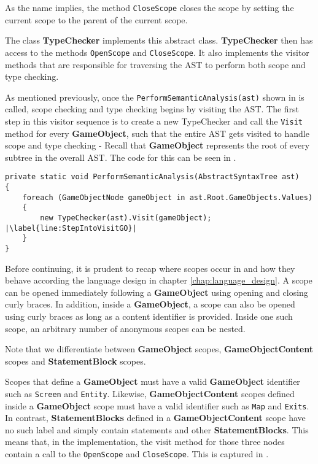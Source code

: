 As the name implies, the method \texttt{CloseScope} closes the scope by setting the current scope to the parent of the current scope. 


The class \textbf{TypeChecker} implements this abstract class. \textbf{TypeChecker} then has access to the methods \texttt{OpenScope} and \texttt{CloseScope}. It also implements the visitor methods that are responsible for traversing the AST to perform both scope and type checking.

As mentioned previously, once the \texttt{PerformSemanticAnalysis(ast)} shown in  is called, scope checking and type checking begins by visiting the AST. The first step in this visitor sequence is to create a new TypeChecker and call the \texttt{Visit} method for every \textbf{GameObject}, such that the entire AST gets visited to handle scope and type checking - Recall that \textbf{GameObject} represents the root of every subtree in the overall AST. The code for this can be seen in .

\begin{lstlisting}[language=CSharp, caption={Typechecker object for every GameObject}, label={lst:TypeCheckEachGO},escapechar=|]
private static void PerformSemanticAnalysis(AbstractSyntaxTree ast)
{
    foreach (GameObjectNode gameObject in ast.Root.GameObjects.Values)
    {
        new TypeChecker(ast).Visit(gameObject); |\label{line:StepIntoVisitGO}|
    }
}
\end{lstlisting}

Before continuing, it is prudent to recap where scopes occur in \dazel{} and how they behave according the language design in chapter \ref{chap:language_design}. A scope can be opened immediately following a \textbf{GameObject} using opening and closing curly braces. In addition, inside a \textbf{GameObject}, a scope can also be opened using curly braces as long as a content identifier is provided. Inside one such scope, an arbitrary number of anonymous scopes can be nested. 

Note that we differentiate between \textbf{GameObject} scopes, \textbf{GameObjectContent} scopes and \textbf{StatementBlock} scopes.

Scopes that define a \textbf{GameObject} must have a valid \textbf{GameObject} identifier such as \texttt{Screen} and \texttt{Entity}. 
Likewise, \textbf{GameObjectContent} scopes defined inside a \textbf{GameObject} scope must have a valid identifier such as \texttt{Map} and \texttt{Exits}. In contrast, \textbf{StatementBlocks} defined in a \textbf{GameObjectContent} scope have no such label and simply contain statements and other \textbf{StatementBlocks}. 
This means that, in the implementation, the visit method for those three nodes contain a call to the \texttt{OpenScope} and \texttt{CloseScope}. This is captured in .

